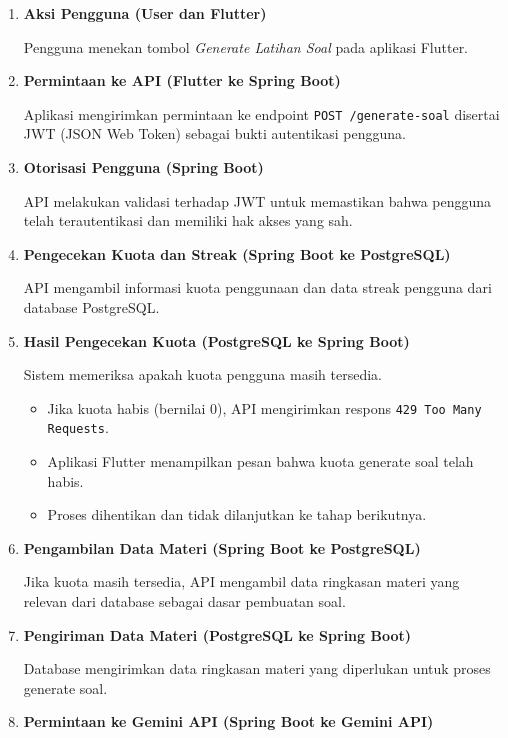 \documentclass[11pt]{article}
\begin{document}
\begin{enumerate}

\item \textbf{Aksi Pengguna (User dan Flutter)}

Pengguna menekan tombol \textit{Generate Latihan Soal} pada aplikasi Flutter.

\item \textbf{Permintaan ke API (Flutter ke Spring Boot)}

Aplikasi mengirimkan permintaan ke endpoint \texttt{POST /generate-soal} disertai JWT (JSON Web Token) sebagai bukti autentikasi pengguna.

\item \textbf{Otorisasi Pengguna (Spring Boot)}

API melakukan validasi terhadap JWT untuk memastikan bahwa pengguna telah terautentikasi dan memiliki hak akses yang sah.

\item \textbf{Pengecekan Kuota dan Streak (Spring Boot ke PostgreSQL)}

API mengambil informasi kuota penggunaan dan data streak pengguna dari database PostgreSQL.

\item \textbf{Hasil Pengecekan Kuota (PostgreSQL ke Spring Boot)}

Sistem memeriksa apakah kuota pengguna masih tersedia.

\begin{itemize}
\item Jika kuota habis (bernilai 0), API mengirimkan respons \texttt{429 Too Many Requests}.
\item Aplikasi Flutter menampilkan pesan bahwa kuota generate soal telah habis.
\item Proses dihentikan dan tidak dilanjutkan ke tahap berikutnya.
\end{itemize}

\item \textbf{Pengambilan Data Materi (Spring Boot ke PostgreSQL)}

Jika kuota masih tersedia, API mengambil data ringkasan materi yang relevan dari database sebagai dasar pembuatan soal.

\item \textbf{Pengiriman Data Materi (PostgreSQL ke Spring Boot)}

Database mengirimkan data ringkasan materi yang diperlukan untuk proses generate soal.

\item \textbf{Permintaan ke Gemini API (Spring Boot ke Gemini API)}


\end{enumerate}
\end{document}
